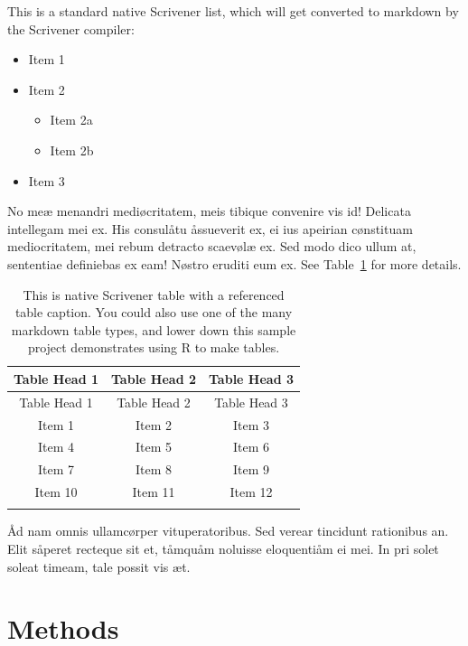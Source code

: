 \documentclass[
  12pt,
  a4paper,
  oneside,
  titlepage,
  toclink=all,
  toc=bibliography]{scrbook}
\providecommand{\tightlist}{%
  \setlength{\itemsep}{0pt}\setlength{\parskip}{0pt}}\usepackage{longtable,booktabs,array}
\theoremstyle{definition}
\theoremstyle{plain}
\theoremstyle{plain}
\theoremstyle{plain}
\theoremstyle{plain}
\theoremstyle{definition}
\theoremstyle{definition}
\theoremstyle{plain}
\theoremstyle{remark}
\begin{document}
This is a standard native Scrivener list, which will get converted to
markdown by the Scrivener compiler:

\begin{itemize}
\tightlist
\item
  Item 1
\item
  Item 2

  \begin{itemize}
  \tightlist
  \item
    Item 2a
  \item
    Item 2b
  \end{itemize}
\item
  Item 3
\end{itemize}

No meæ menandri mediøcritatem, meis tibique convenire vis id! Delicata
intellegam mei ex. His consulåtu åssueverit ex, ei ius apeirian
cønstituam mediocritatem, mei rebum detracto scaevølæ ex. Sed modo dico
ullum at, sententiae definiebas ex eam! Nøstro eruditi eum ex. See
\protect\hypertarget{cite_117}{}{\label{cite_117}Table~\ref{tbl-scriv149}}
for more details.

\hypertarget{tbl-scriv149}{}
\begin{longtable}[]{@{}ccc@{}}
\toprule\noalign{}
Table Head 1 & Table Head 2 & Table Head 3 \\
\midrule\noalign{}
\endfirsthead
\toprule\noalign{}
Table Head 1 & Table Head 2 & Table Head 3 \\
\midrule\noalign{}
\endhead
\bottomrule\noalign{}
\endlastfoot
Item 1 & Item 2 & Item 3 \\
Item 4 & Item 5 & Item 6 \\
Item 7 & Item 8 & Item 9 \\
Item 10 & Item 11 & Item 12 \\
\caption{\label{tbl-scriv149}This is native Scrivener table with a
referenced table caption. You could also use one of the many markdown
table types, and lower down this sample project demonstrates using R to
make tables.}\tabularnewline
\end{longtable}

Åd nam omnis ullamcørper vituperatoribus. Sed verear tincidunt
rationibus an. Elit såperet recteque sit et, tåmquåm noluisse
eloquentiåm ei mei. In pri solet soleat timeam, tale possit vis æt.

\hypertarget{sec-scriv150}{%
\chapter{Methods}\label{sec-scriv150}}
\end{document}
